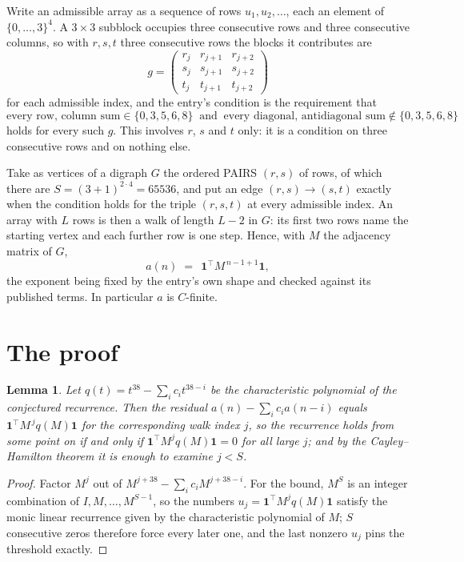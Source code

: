 \documentclass[11pt,a4paper]{article}
\theoremstyle{plain}
\newtheorem{lemma}[theorem]{Lemma}
\theoremstyle{definition}
\begin{document}
Write an admissible array as a sequence of rows $u_1,u_2,\dots$, each an element of
$\{0,\dots,3\}^{4}$. A $3\times3$ subblock occupies three consecutive rows and
three consecutive columns, so with $r,s,t$ three consecutive rows the blocks it
contributes are
\[
g=\begin{pmatrix}r_j&r_{j+1}&r_{j+2}\\ s_j&s_{j+1}&s_{j+2}\\ t_j&t_{j+1}&t_{j+2}\end{pmatrix}
\]
for each admissible index, and the entry's condition is the requirement that
\[
\text{every row, column sum} \in \{0,3,5,6,8\}\ \text{ and }\ \text{every diagonal, antidiagonal sum} \notin \{0,3,5,6,8\}
\]
holds for every such $g$. This involves $r$, $s$ and $t$ only: it is a condition on
three consecutive rows and on nothing else.

Take as vertices of a digraph $G$ the ordered PAIRS $(r,s)$ of rows, of which there are
$S=(3+1)^{2\cdot4}=65536$, and put an edge $(r,s)\to(s,t)$ exactly when the condition
holds for the triple $(r,s,t)$ at every admissible index. An array with $L$ rows is then a
walk of length $L-2$ in $G$: its first two rows name the starting vertex and each further
row is one step. Hence, with $M$ the adjacency matrix of $G$,
\[
a(n)\;=\;\,\mathbf{1}^{\!\top}M^{\,n-1+1}\mathbf{1},
\]
the exponent being fixed by the entry's own shape and checked against its published terms.
In particular $a$ is $C$-finite.

\section{The proof}

\begin{lemma}\label{lem:crit}
Let $q(t)=t^{38}-\sum_i c_it^{38-i}$ be the characteristic polynomial of the
conjectured recurrence. Then the residual $a(n)-\sum_ic_ia(n-i)$ equals
$\mathbf{1}^{\!\top}M^{\,j}q(M)\mathbf{1}$ for the corresponding walk index
$j$, so the recurrence holds from some point on if and only if
$\mathbf{1}^{\!\top}M^{j}q(M)\mathbf{1}=0$ for all large $j$; and by the
Cayley--Hamilton theorem it is enough to examine $j<S$.
\end{lemma}

\begin{proof}
Factor $M^{j}$ out of $M^{j+38}-\sum_ic_iM^{j+38-i}$. For the bound, $M^{S}$
is an integer combination of $I,M,\dots,M^{S-1}$, so the numbers
$u_j=\mathbf{1}^{\!\top}M^{j}q(M)\mathbf{1}$ satisfy the monic linear recurrence given by
the characteristic polynomial of $M$; $S$ consecutive zeros therefore force every later one,
and the last nonzero $u_j$ pins the threshold exactly.
\end{proof}
\end{document}
